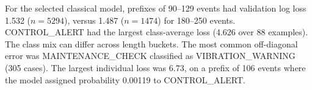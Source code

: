 For the selected classical model, prefixes of 90--129 events had validation log loss 1.532 (\(n=5294\)), versus 1.487 (\(n=1474\)) for 180--250 events. CONTROL\_ALERT had the largest class-average loss (4.626 over 88 examples). The class mix can differ across length buckets. The most common off-diagonal error was MAINTENANCE\_CHECK classified as VIBRATION\_WARNING (305 cases). The largest individual loss was 6.73, on a prefix of 106 events where the model assigned probability 0.00119 to CONTROL\_ALERT.

